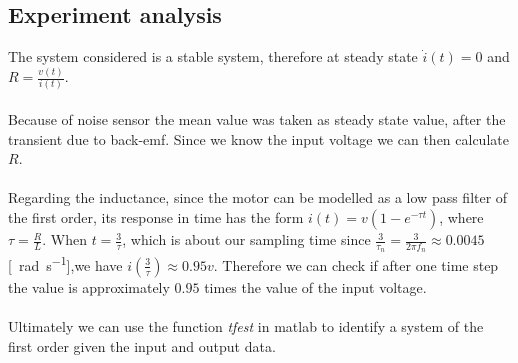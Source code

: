 \subsection{Experiment analysis}
The system considered is a stable system, therefore at steady state $\dot{i}(t) = 0$ and $R = \frac{v(t)}{i(t)}$. \\ \\
Because of noise sensor the mean value was taken as steady state value, after the transient due to back-emf. Since we know the input voltage we can then calculate $R$. \\ \\
Regarding the inductance, since the motor can be modelled as a low pass filter of the first order, its response in time has the form $i(t) = v (1-e^{-\tau t})$, where $\tau = \frac{R}{L}$.  When $t=\frac{3}{\tau}$, which is about our sampling time since $\frac{3}{\tau_n}=\frac{3}{2\pi f_n} \approx 0.0045$ [\SI{}{\radian \per \second}],we have $i(\frac{3}{\tau}) \approx 0.95v$. Therefore we can check if after one time step the value is approximately $0.95$ times the value of the input voltage. \\ \\ 
Ultimately we can use the function \emph{tfest} in matlab to identify a system of the first order given the input and output data.
